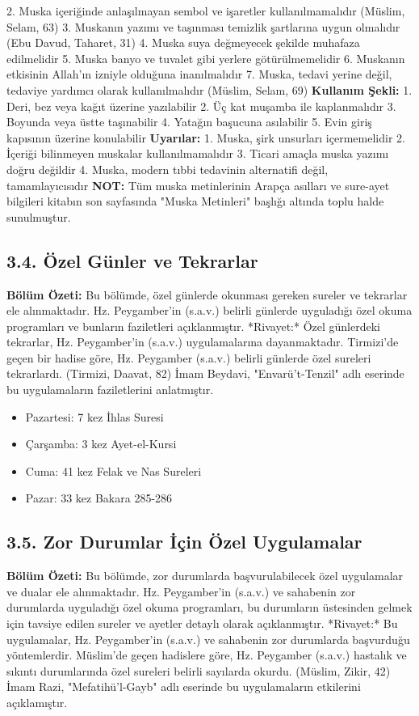 \documentclass[12pt,a4paper]{article}
\begin{document}
2. Muska içeriğinde anlaşılmayan sembol ve işaretler kullanılmamalıdır (Müslim, Selam, 63)
3. Muskanın yazımı ve taşınması temizlik şartlarına uygun olmalıdır (Ebu Davud, Taharet, 31)
4. Muska suya değmeyecek şekilde muhafaza edilmelidir
5. Muska banyo ve tuvalet gibi yerlere götürülmemelidir
6. Muskanın etkisinin Allah'ın izniyle olduğuna inanılmalıdır
7. Muska, tedavi yerine değil, tedaviye yardımcı olarak kullanılmalıdır (Müslim, Selam, 69)
\textbf{Kullanım Şekli:}
1. Deri, bez veya kağıt üzerine yazılabilir
2. Üç kat muşamba ile kaplanmalıdır
3. Boyunda veya üstte taşınabilir
4. Yatağın başucuna asılabilir
5. Evin giriş kapısının üzerine konulabilir
\textbf{Uyarılar:}
1. Muska, şirk unsurları içermemelidir
2. İçeriği bilinmeyen muskalar kullanılmamalıdır
3. Ticari amaçla muska yazımı doğru değildir
4. Muska, modern tıbbi tedavinin alternatifi değil, tamamlayıcısıdır
\textbf{NOT:} Tüm muska metinlerinin Arapça asılları ve sure-ayet bilgileri kitabın son sayfasında "Muska Metinleri" başlığı altında toplu halde sunulmuştur.
\subsection{3.4. Özel Günler ve Tekrarlar}
\textbf{Bölüm Özeti:}
Bu bölümde, özel günlerde okunması gereken sureler ve tekrarlar ele alınmaktadır. Hz. Peygamber'in (s.a.v.) belirli günlerde uyguladığı özel okuma programları ve bunların faziletleri açıklanmıştır.
*Rivayet:* Özel günlerdeki tekrarlar, Hz. Peygamber'in (s.a.v.) uygulamalarına dayanmaktadır. Tirmizi'de geçen bir hadise göre, Hz. Peygamber (s.a.v.) belirli günlerde özel sureleri tekrarlardı. (Tirmizi, Daavat, 82) İmam Beydavi, "Envarü't-Tenzil" adlı eserinde bu uygulamaların faziletlerini anlatmıştır.
\begin{itemize}
\item Pazartesi: 7 kez İhlas Suresi
\item Çarşamba: 3 kez Ayet-el-Kursi
\item Cuma: 41 kez Felak ve Nas Sureleri
\item Pazar: 33 kez Bakara 285-286
\end{itemize}
\subsection{3.5. Zor Durumlar İçin Özel Uygulamalar}
\textbf{Bölüm Özeti:}
Bu bölümde, zor durumlarda başvurulabilecek özel uygulamalar ve dualar ele alınmaktadır. Hz. Peygamber'in (s.a.v.) ve sahabenin zor durumlarda uyguladığı özel okuma programları, bu durumların üstesinden gelmek için tavsiye edilen sureler ve ayetler detaylı olarak açıklanmıştır.
*Rivayet:* Bu uygulamalar, Hz. Peygamber'in (s.a.v.) ve sahabenin zor durumlarda başvurduğu yöntemlerdir. Müslim'de geçen hadislere göre, Hz. Peygamber (s.a.v.) hastalık ve sıkıntı durumlarında özel sureleri belirli sayılarda okurdu. (Müslim, Zikir, 42) İmam Razi, "Mefatihü'l-Gayb" adlı eserinde bu uygulamaların etkilerini açıklamıştır.
\end{document}
